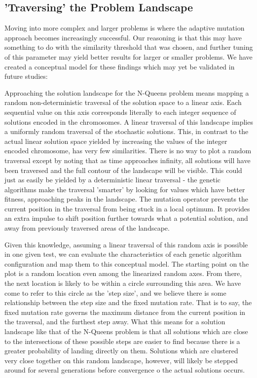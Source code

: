 \documentclass{sig-alternate}
\begin{document}
\subsection{'Traversing' the Problem Landscape}
Moving into more complex and larger problems is where the adaptive mutation approach becomes increasingly successful. Our reasoning is that this may have something to do with the similarity threshold that was chosen, and further tuning of this parameter may yield better results for larger or smaller problems. We have created a conceptual model for these findings which may yet be validated in future studies:

Approaching the solution landscape for the N-Queens problem means mapping a random non-deterministic traversal of the solution space to a linear axis. Each sequential value on this axis corresponds literally to each integer sequence of solutions encoded in the chromosomes. A linear traversal of this landscape implies a uniformly random traversal of the stochastic solutions. This, in contrast to the actual linear solution space yielded by increasing the values of the integer encoded chromosome, has very few similarities. There is no way to plot a random traversal except by noting that as time approaches infinity, all solutions will have been traversed and the full contour of the landscape will be visible. This could just as easily be yielded by a deterministic linear traversal - the genetic algorithms make the traversal 'smarter' by looking for values which have better fitness, approaching peaks in the landscape. The mutation operator prevents the current position in the traversal from being stuck in a local optimum. It provides an extra impulse to shift position further towards what a potential solution, and away from previously traversed areas of the landscape.

Given this knowledge, assuming a linear traversal of this random axis is possible in one given test, we can evaluate the characteristics of each genetic algorithm configuration and map them to this conceptual model. The starting point on the plot is a random location even among the linearized random axes. From there, the next location is likely to be within a circle surrounding this area. We have come to refer to this circle as the 'step size', and we believe there is some relationship between the step size and the fixed mutation rate. That is to say, the fixed mutation rate governs the maximum distance from the current position in the traversal, and the furthest step away. What this means for a solution landscape like that of the N-Queens problem is that all solutions which are close to the intersections of these possible steps are easier to find because there is a greater probability of landing directly on them. Solutions which are clustered very close together on this random landscape, however, will likely be stepped around for several generations before convergence o the actual solutions occurs.
\end{document}
